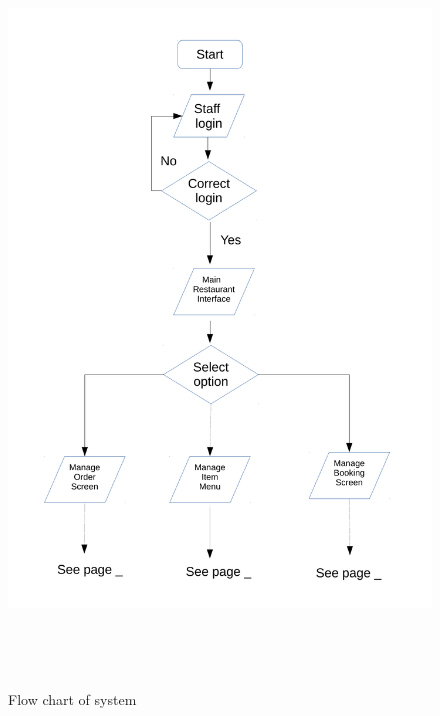 \begin{figure}[H]
    \includegraphics[height = 20cm]{./Design/Images/flowchart1}
    \caption{Flow chart of system} \label{fig:Flowchart1}
\end{figure}

